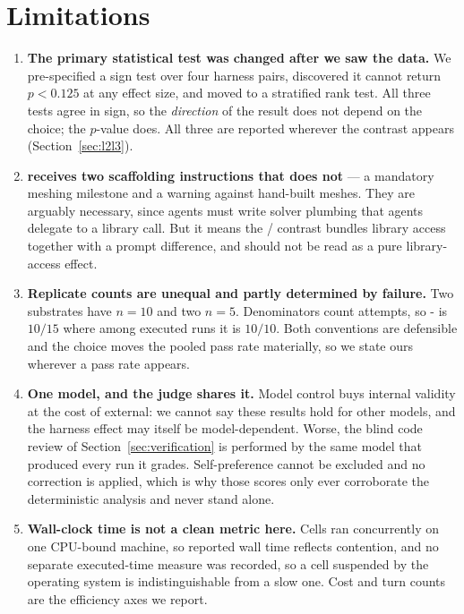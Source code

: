 \section{Limitations}
\label{sec:limitations}

\begin{enumerate}
\item \textbf{The primary statistical test was changed after we saw the data.}
  We pre-specified a sign test over four harness pairs, discovered it cannot
  return $p < 0.125$ at any effect size, and moved to a stratified rank test.
  All three tests agree in sign, so the \emph{direction} of the result does not
  depend on the choice; the $p$-value does. All three are reported wherever the
  contrast appears (Section~\ref{sec:l2l3}).

\item \textbf{\Lthree{} receives two scaffolding instructions that \Ltwo{} does
  not} --- a mandatory meshing milestone and a warning against hand-built
  meshes. They are arguably necessary, since \Lthree{} agents must write solver
  plumbing that \Ltwo{} agents delegate to a library call. But it means the
  \Ltwo{}/\Lthree{} contrast bundles library access together with a prompt
  difference, and should not be read as a pure library-access effect.

\item \textbf{Replicate counts are unequal and partly determined by failure.}
  Two substrates have $n=10$ and two $n=5$. Denominators count attempts, so
  \Ltwo{}- is $10/15$ where among executed runs it is $10/10$. Both
  conventions are defensible and the choice moves the pooled \Ltwo{} pass rate
  materially, so we state ours wherever a pass rate appears.

\item \textbf{One model, and the judge shares it.} Model control buys internal
  validity at the cost of external: we cannot say these results hold for other
  models, and the harness effect may itself be model-dependent. Worse, the
  blind code review of Section~\ref{sec:verification} is performed by the same
  model that produced every run it grades. Self-preference cannot be excluded
  and no correction is applied, which is why those scores only ever corroborate
  the deterministic analysis and never stand alone.

\item \textbf{Wall-clock time is not a clean metric here.} Cells ran
  concurrently on one CPU-bound machine, so reported wall time reflects
  contention, and no separate executed-time measure was recorded, so a cell
  suspended by the operating system is indistinguishable from a slow one. Cost
  and turn counts are the efficiency axes we report.


\end{enumerate}
